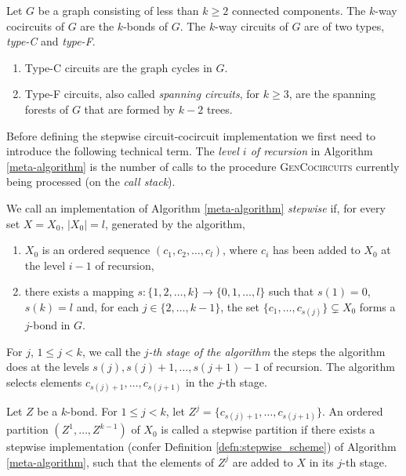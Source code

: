 \begin{claim}
	\label{circuit_types}
	Let $G$ be a graph consisting of less than $k \geq 2$ connected components.
	The $k$-way cocircuits of $G$ are the $k$-bonds of $G$. The $k$-way circuits of $G$ are of two types, \textit{type-C} and \textit{type-F}.

	\begin{enumerate}
		\item Type-C circuits are the graph cycles in $G$.
		\item Type-F circuits, also called \textit{spanning circuits}, for $k \geq 3$, are the spanning forests of $G$ that are formed by $k-2$ trees.
	\end{enumerate}
\end{claim}

Before defining the stepwise circuit-cocircuit implementation we first need to introduce the following technical term. The \textit{level $i$ of recursion} in Algorithm \ref{meta-algorithm} is the number of calls to the procedure \textsc{GenCocircuits} currently being processed (on the \textit{call stack}).

\begin{defn}
	\label{defn:stepwise_scheme}

	We call an implementation of Algorithm \ref{meta-algorithm} \textit{stepwise} if, for every set $X = X_0$, $\lvert X_0 \rvert = l$, generated by the algorithm,

	\begin{enumerate}
		\item $X_0$ is an ordered sequence $(c_1, c_2,\ldots,c_l)$, where $c_i$ has been \linebreak added to $X_0$ at the level $i-1$ of recursion,
		\item there exists a mapping $s : \{1,2,\ldots,k\} \rightarrow \{0,1,\ldots,l\}$ such that $s(1) = 0$, $s(k) = l$ and, for each $j \in \{2,\ldots,k-1\}$, the set $\{c_1,\ldots,c_{s(j)}\} \subsetneq X_0$ forms a $j$-bond in $G$.
	\end{enumerate}

	\noindent For $j$, $1 \leq j < k$, we call the \textit{$j$-th stage of the algorithm} the steps the algorithm does at the levels $s(j), s(j) + 1,\ldots, s(j+1)-1$ of recursion. The algorithm selects elements $c_{s(j)+1},\ldots,c_{s(j+1)}$ in the $j$-th stage.

\end{defn}

\begin{defn}
	\label{defn:stepwise_partition}

	Let $Z$ be a $k$-bond. For $1 \leq j < k$, let $Z^{j} = \{c_{s(j)+1},\ldots,c_{s(j+1)}\}$. An ordered partition $(Z^1, \ldots, Z^{k-1})$ of $X_0$ is called a stepwise partition if there exists a stepwise implementation (confer Definition \ref{defn:stepwise_scheme}) of Algorithm \ref{meta-algorithm}, such that the elements of $Z^j$ are added to $X$ in its $j$-th stage.

\end{defn}

